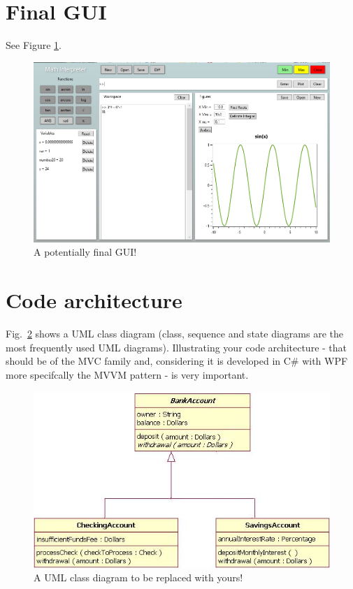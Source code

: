 \documentclass[a4paper, oneside, 11pt]{report}
\begin{document}
    \section{Final GUI}

    See Figure \ref{gui02}.

    \begin{figure}[htb]
        \includegraphics[width=0.9 \columnwidth]{GUI_02.png}
        \caption{A potentially final GUI!}
        \label{gui02}
    \end{figure}

    \section{Code architecture}

    Fig.\ \ref{class} shows a UML class diagram (class, sequence and state diagrams are the most frequently used UML diagrams). Illustrating your code architecture - that should be of the MVC family and, considering it is developed in C\# with WPF more specifcally the MVVM pattern - is very important.

    \begin{figure}[htb]
        \includegraphics[width=1.0 \columnwidth]{class.png}
        \caption{A UML class diagram to be replaced with yours!}
        \label{class}
    \end{figure}
\end{document}
